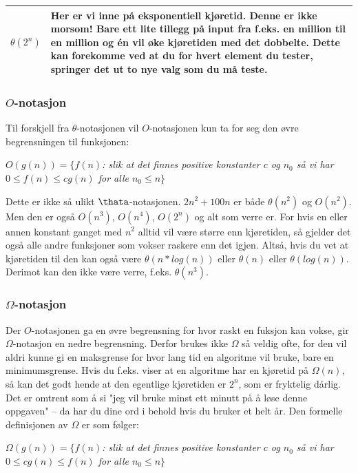 \begin{table}[H]
\begin{tabular}{|L{5em} | L{35em}|}
        $\theta(2^n)$ & Her er vi inne på eksponentiell kjøretid. Denne er ikke morsom! Bare ett lite tillegg på input fra f.eks. en million til en million og én vil øke kjøretiden med det dobbelte. Dette kan forekomme ved at du for hvert element du tester, springer det ut to nye valg som du må teste.\\
         \hline
    \end{tabular}
\end{table}

\subsubsection{$O$-notasjon}
Til forskjell fra $\theta$-notasjonen vil $O$-notasjonen kun ta for seg den øvre begrensningen til funksjonen:

\begin{center}
\textit{$O(g(n)) = \{ f(n)$: slik at det finnes positive konstanter $c$ og $n_0$ så vi har $0 \leq f(n) \leq cg(n)$ for alle $n_0 \leq n \}$}
\end{center}

\noindent Dette er ikke så ulikt $\thata$-notasjonen. $2n^2 + 100n$ er både $\theta(n^2)$ og $O(n^2)$. Men den er også $O(n^3)$, $O(n^4)$, $O(2^n)$ og alt som verre er. For hvis en eller annen konstant ganget med $n^2$ alltid vil være større enn kjøretiden, så gjelder det også alle andre funksjoner som vokser raskere enn det igjen. Altså, hvis du vet at kjøretiden til den kan også være $\theta(n*log(n))$ eller $\theta(n)$ eller $\theta(log(n))$. Derimot kan den ikke være verre, f.eks. $\theta(n^3)$.

\subsubsection{$\Omega$-notasjon}
Der $O$-notasjonen ga en øvre begrensning for hvor raskt en fuksjon kan vokse, gir $\Omega$-notasjon en nedre begrensning. Derfor brukes ikke $\Omega$ så veldig ofte, for den vil aldri kunne gi en maksgrense for hvor lang tid en algoritme vil bruke, bare en minimumsgrense. Hvis du f.eks. viser at en algoritme har en kjøretid på $\Omega(n)$, så kan det godt hende at den egentlige kjøretiden er $2^n$, som er fryktelig dårlig. Det er omtrent som å si "jeg vil bruke minst ett minutt på å løse denne oppgaven" – da har du dine ord i behold hvis du bruker et helt år. Den formelle definisjonen av $\Omega$ er som følger:

\begin{center}
\textit{$\Omega(g(n)) = \{ f(n)$: slik at det finnes positive konstanter $c$ og $n_0$ så vi har $0 \leq cg(n) \leq f(n)$ for alle $n_0 \leq n \}$}
\end{center}

